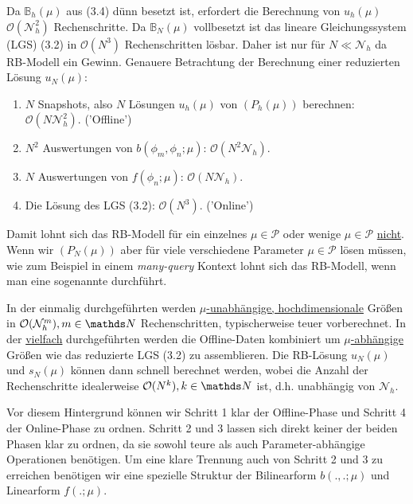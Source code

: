 Da $\mathbb{B}_h(\mu)$ aus (3.4) dünn besetzt ist, erfordert die Berechnung von $u_h(\mu)$ $ \mathcal{O}(\mathcal{N}_h^2)$ Rechenschritte.
Da $\mathbb{B}_N(\mu)$ vollbesetzt ist das lineare Gleichungssystem (LGS) (3.2) in $\mathcal{O}(N^3)$ Rechenschritten lösbar.
Daher ist nur für $N\ll \mathcal{N}_h$ da RB-Modell ein Gewinn.
Genauere Betrachtung der Berechnung einer reduzierten Lösung $u_N(\mu)$:
\begin{enumerate}[(1)]
	\item $N$ Snapshots, also $N$ Lösungen $u_h(\mu)$ von $(P_h(\mu))$ berechnen: $\mathcal{O}(N\mathcal{N}_h^2)$. ('Offline')
	\item $N^2$ Auswertungen von $b(\phi_m,\phi_n;\mu)$: $\mathcal{O}(N^2\mathcal{N}_h)$.
	\item $N$ Auswertungen von $f(\phi_n;\mu)$: $\mathcal{O}(N\mathcal{N}_h)$.
	\item Die Lösung des LGS (3.2): $\mathcal{O}(N^3)$. ('Online')
\end{enumerate}
Damit lohnt sich das RB-Modell für ein einzelnes $\mu\in\mathcal{P}$ oder wenige $\mu\in\mathcal{P}$ \uline{nicht}.
Wenn wir $(P_N(\mu))$ aber für viele verschiedene Parameter $\mu\in\mathcal{P}$ lösen müssen, wie zum Beispiel in einem \textit{many-query} Kontext lohnt sich das RB-Modell, wenn man eine sogenannte  durchführt.

In der einmalig durchgeführten  werden \uline{$\mu$-unabhängige, hochdimensionale} Größen in $\mathcal{O}(\mathcal{N}_h^m),m\in \N$ Rechenschritten, typischerweise teuer vorberechnet.
In der \uline{vielfach} durchgeführten  werden die Offline-Daten kombiniert um \uline{$\mu$-abhängige} Größen wie das reduzierte LGS (3.2) zu assemblieren.
Die RB-Lösung $u_N(\mu)$ und $s_N(\mu)$ können dann schnell berechnet werden, wobei die Anzahl der Rechenschritte idealerweise $\mathcal{O}(N^k),k\in \N$ ist, d.h. unabhängig von $\mathcal{N}_h$.

Vor diesem Hintergrund können wir Schritt 1 klar der Offline-Phase und Schritt 4 der Online-Phase zu ordnen.
Schritt 2 und 3 lassen sich direkt keiner der beiden Phasen klar zu ordnen, da sie sowohl teure als auch Parameter-abhängige Operationen benötigen.
Um eine klare Trennung auch von Schritt 2 und 3 zu erreichen benötigen wir eine spezielle Struktur der Bilinearform $b(.,.;\mu)$ und Linearform $f(.;\mu)$.
 
